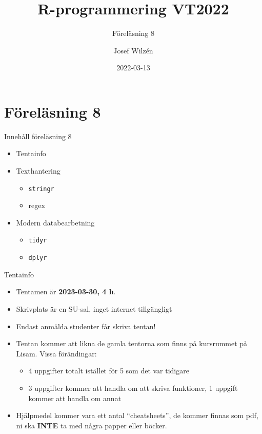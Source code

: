 \documentclass[
  11pt,
  ignorenonframetext,
  handout]{beamer}
\title{R-programmering VT2022}
\subtitle{Föreläsning 8}
\author{Josef Wilzén}
\date{2022-03-13}
\institute{Linköpings Universitet}
\providecommand{\tightlist}{%
  \setlength{\itemsep}{0pt}\setlength{\parskip}{0pt}}
\begin{document}
\frame{\titlepage}

\hypertarget{fuxf6reluxe4sning-8}{%
\section{Föreläsning 8}\label{fuxf6reluxe4sning-8}}



\begin{frame}{Innehåll föreläsning 8}
\protect\hypertarget{innehuxe5ll-fuxf6reluxe4sning-8}{}
\begin{itemize}
\tightlist
\item
  Tentainfo
\item
  Texthantering

  \begin{itemize}
  \tightlist
  \item
    \texttt{stringr}
  \item
    regex
  \end{itemize}
\item
  Modern databearbetning

  \begin{itemize}
  \tightlist
  \item
    \texttt{tidyr}
  \item
    \texttt{dplyr}
  \end{itemize}
\end{itemize}
\end{frame}


\begin{frame}{Tentainfo}
\protect\hypertarget{tentainfo}{}
\begin{itemize}
\tightlist
\item
  Tentamen är \textbf{2023-03-30, 4 h}.
\item
  Skrivplats är en SU-sal, inget internet tillgängligt
\item
  Endast anmälda studenter får skriva tentan!
\item
  Tentan kommer att likna de gamla tentorna som finns på kursrummet på Lisam. Vissa förändingar:
  \begin{itemize}
  \tightlist
  \item
    4 uppgifter totalt istället för 5 som det var tidigare
  \item
    3 uppgifter kommer att handla om att skriva funktioner, 1 uppgift kommer att handla om annat
  \end{itemize}
\item
  Hjälpmedel kommer vara ett antal ``cheatsheets'', de kommer finnas som
  pdf, ni ska \textbf{INTE} ta med några papper eller böcker.
\end{itemize}
\end{frame}
\end{document}
